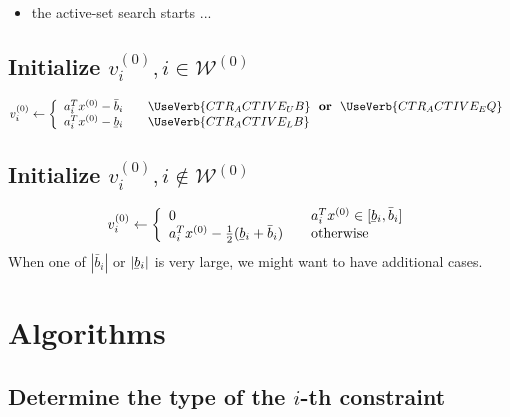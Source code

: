 \documentclass[12pt,a4paper]{article}
\newcommand{\abs}[1]{\left\lvert#1\right\rvert}
\newcommand{\ubar}[1]{\underaccent{\bar}{#1}}
\begin{document}
\begin{itemize}
\item the active-set search starts ...
\end{itemize}

\subsection{Initialize $v_i^{(0)}, i\in\mathcal{W}^{(0)}$}

\begin{align} \label{eq.v0_active}
  v_i^{(0)} \leftarrow \left\{ 
  \begin{array}{l l}
    a_i^Tx^{(0)} - \bar{b}_i & \quad \UseVerb{CTR_ACTIVE_UB} \,\,\,\, \text{\bf or} \,\,\,\, \UseVerb{CTR_ACTIVE_EQ} \\
    a_i^Tx^{(0)} - \ubar{b}_i & \quad \UseVerb{CTR_ACTIVE_LB}
  \end{array} \right.
\end{align}

\subsection{Initialize $v_i^{(0)}, i\not\in\mathcal{W}^{(0)}$}
%
\begin{align} \label{eq.v0_inactive}
  v_i^{(0)} \leftarrow \left\{ 
  \begin{array}{l l}
    0 & \quad a_i^Tx^{(0)} \in [\ubar{b}_i,\bar{b}_i] \\
    a^T_ix^{(0)} - \frac{1}{2}(\ubar{b}_i + \bar{b}_i) & \quad \text{otherwise}
  \end{array} \right.
\end{align}
%
When one of $\abs{\bar{b}_i}$ or $\abs{\ubar{b}_i}$ is very large, we might want to have additional
cases. %

\clearpage

\section{Algorithms}

\subsection{Determine the type of the $i$-th constraint}
\end{document}

